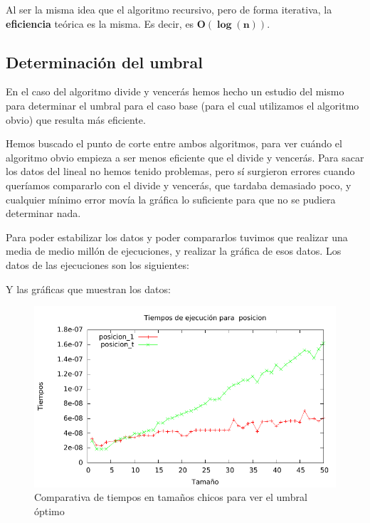 Al ser la misma idea que el algoritmo recursivo, pero de forma iterativa, la \textbf{eficiencia} teórica es la misma. Es decir, es  $\mathbf{O(\log(n))}$.

\newpage

\subsection{Determinación del umbral}

En el caso del algoritmo divide y vencerás hemos hecho un estudio del mismo para determinar el umbral para el caso base (para el cual utilizamos el algoritmo obvio) que resulta más eficiente.

Hemos buscado el punto de corte entre ambos algoritmos, para ver cuándo el algoritmo obvio empieza a ser menos eficiente que el divide y vencerás. Para sacar los datos del lineal no hemos tenido problemas, pero sí surgieron errores cuando queríamos compararlo con el divide y vencerás, que tardaba demasiado poco, y cualquier mínimo error movía la gráfica lo suficiente para que no se pudiera determinar nada.

Para poder estabilizar los datos y poder compararlos tuvimos que realizar una media de medio millón de ejecuciones, y realizar la gráfica de esos datos. Los datos de las ejecuciones son los siguientes:

\vspace*{1cm}

\posObvioComp
{}\posDyVComp
{} {\posObvioComp}
\pgfplotstabletypeset[
display columns/0/.style={column name=Tamaño},
display columns/1/.style={column name=Algoritmo Obvio},
display columns/2/.style={column name=Algoritmo DyV (rec)},
skip rows between index={30}{50}
]{\posObvioComp}


\newpage

Y las gráficas que muestran los datos:
\begin{figure}[H]\includegraphics[width=13cm]{img/posicion_todos1_g_50.pdf} \centering
	\caption{Comparativa de tiempos en tamaños chicos para ver el umbral óptimo}\end{figure}

